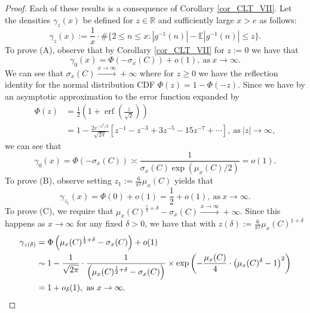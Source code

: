 \documentclass[11pt,reqno,a4letter]{article}
\numberwithin{figure}{section}
\numberwithin{table}{section}
\theoremstyle{plain}
\numberwithin{theorem}{section}
\theoremstyle{definition}
\begin{document}
\begin{proof} 
Each of these results is a consequence of Corollary \ref{cor_CLT_VII}. 
Let the densities $\gamma_z(x)$ be defined for $z \in \mathbb{R}$ and sufficiently 
large $x > e$ as follows: 
\[
\gamma_z(x) := \frac{1}{x} \cdot \#\{2 \leq n \leq x: |g^{-1}(n)| - \mathbb{E}|g^{-1}(n)| \leq z\}. 
\]
To prove (A), observe that by Corollary \ref{cor_CLT_VII} for $z := 0$ we have that 
\[
\gamma_0(x) = \Phi\left(-\sigma_x(C)\right) + o(1), \mathrm{\ as\ } x \rightarrow \infty. 
\]
We can see that $\sigma_x(C) \xrightarrow{x \rightarrow \infty} +\infty$ where for $z \geq 0$ we have the 
reflection identity for the normal distribution CDF 
$\Phi(z) = 1 - \Phi(-z)$. Since we have by an asymptotic approximation 
to the error function expanded by 
\begin{align*} 
\Phi(z) & = \frac{1}{2}\left(1 + \operatorname{erf}\left(\frac{z}{\sqrt{2}}\right)\right) \\ 
     & = 1 - \frac{2e^{-z^2/2}}{\sqrt{2\pi}}\left[ 
     z^{-1} - z^{-3} + 3z^{-5} - 15z^{-7} + \cdots 
     \right], \mathrm{\ as\ } |z| \rightarrow \infty, 
\end{align*} 
we can see that 
\[
\gamma_0(x) = \Phi\left(-\sigma_x(C)\right) \asymp \frac{1}{\sigma_x(C) \exp(\mu_x(C)/2)} = o(1). 
\]
To prove (B), observe setting $z_1 := \frac{6}{\pi^2} \mu_x(C)$ yields that 
\[
\gamma_{z_1}(x) = \Phi(0) + o(1) = \frac{1}{2} + o(1), \mathrm{\ as\ } x \rightarrow \infty. 
\]
To prove (C), we require that 
$\mu_x(C)^{\frac{1}{2} + \delta} - \sigma_x(C) \xrightarrow{x \rightarrow \infty} +\infty$. 
Since this happens as $x \rightarrow \infty$ for any fixed $\delta > 0$, we have that 
with $z(\delta) := \frac{6}{\pi^2} \mu_x(C)^{1 + \delta}$ 
\begin{align*} 
\gamma_{z(\delta)} & = \Phi\left(\mu_x(C)^{\frac{1}{2} + \delta} - \sigma_x(C)\right) + o(1) \\ 
     & \sim 1 - \frac{1}{\sqrt{2\pi}} \cdot \frac{1}{\left(\mu_x(C)^{\frac{1}{2} + \delta} - \sigma_x(C)\right)} \times 
     \exp\left(-\frac{\mu_x(C)}{4} \cdot \left(\mu_x(C)^{\delta} - 1\right)^2\right) \\ 
     & = 1 + o_{\delta}(1), \mathrm{\ as\ } x \rightarrow \infty. 
     \qedhere 
\end{align*} 
\end{proof} 
\end{document}
